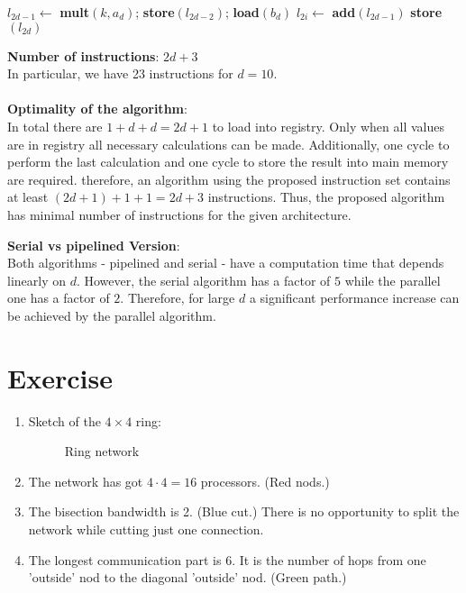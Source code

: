 \documentclass{article}
\begin{document}
\begin{enumerate}[label=(\alph*)]
\begin{algorithmic}[1]
      \EndFor
      \State $l_{2d-1} \gets $ \textbf{mult}$(k,a_d)$; \textbf{store}$(l_{2d-2})$; \textbf{load}$(b_d)$
      \State $l_{2i} \gets $ \textbf{add}$(l_{2d-1})$
      \State \textbf{store}$(l_{2d})$
    \end{algorithmic}
    \textbf{Number of instructions}: $2d+3$ \\
    In particular, we have 23 instructions for $d = 10$. \\ \\
    \textbf{Optimality of the algorithm}: \\
    In total there are $1+d+d = 2d +1 $ to load into registry. Only when all values are in registry all necessary calculations can be made. Additionally, one cycle to perform the last calculation and one cycle to store the result into main memory are required. therefore, an algorithm using the proposed instruction set contains at least $(2d+1) + 1 + 1 = 2d + 3$ instructions. Thus, the proposed algorithm has minimal number of instructions for the given architecture. 

    \textbf{Serial vs pipelined Version}: \\
    Both algorithms - pipelined and serial - have a computation time that depends linearly on $d$. However, the serial algorithm has a factor of $5$ while the parallel one has a factor of $2$. Therefore, for large $d$ a significant performance increase can be achieved by the parallel algorithm.
\end{enumerate}

\section{Exercise}
\begin{enumerate}[label=(\alph*)]
  \item Sketch of the $4\times 4$ ring:
    \begin{figure}[H]
      \centering
      
      \caption{Ring network}
    \end{figure}

  \item The network has got $4\cdot 4 =16$ processors. (Red nods.)
  \item The bisection bandwidth is 2. (Blue cut.) There is no opportunity to split the network while cutting just one connection.
  \item The longest communication part is 6. It is the number of hops from one 'outside' nod to the diagonal 'outside' nod. (Green path.)
\end{enumerate}




\end{document}
